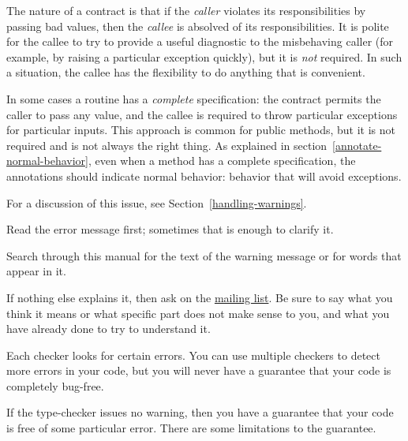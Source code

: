 The nature of a contract is that if the \emph{caller} violates its
responsibilities by passing bad values, then the \emph{callee} is absolved
of its responsibilities.  It is polite for the callee to try to provide a
useful diagnostic to the misbehaving caller (for example, by raising a
particular exception quickly), but it is \emph{not} required.  In such a
situation, the callee has the flexibility to do anything that is
convenient.

In some cases a routine has a \emph{complete} specification:  the contract
permits the caller to pass any value, and the callee is required to throw
particular exceptions for particular inputs.  This approach is common for
public methods, but it is not required and is not always the right thing.
As explained in section~\ref{annotate-normal-behavior}, even when a method
has a complete specification, the annotations should indicate normal
behavior:  behavior that will avoid exceptions.





For a discussion of this issue, see Section~\ref{handling-warnings}.



Read the error message first; sometimes that is enough to clarify it.

Search through this manual for the text of the warning message or for words
that appear in it.

If nothing else explains it, then ask on the
\href{https://groups.google.com/forum/#!forum/checker-framework-discuss}{mailing
  list}.  Be sure to say what you think it means or what specific part does
not make sense to you, and what you have already done to try to understand it.



Each checker looks for certain errors.  You can use multiple checkers to
detect more errors in your code, but you will never have a guarantee that
your code is completely bug-free.

If the type-checker issues no warning, then you have a guarantee that your
code is free of some particular error.  There are some limitations to the
guarantee.

